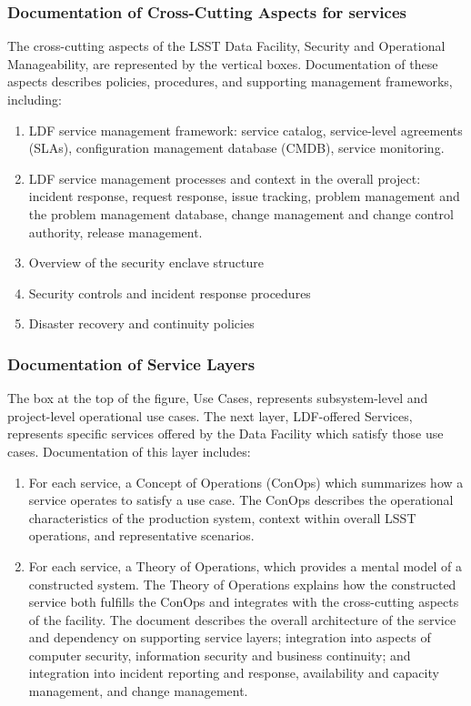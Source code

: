 \subsubsection {Documentation of Cross-Cutting Aspects for services}

The cross-cutting aspects of the LSST Data Facility, Security and Operational Manageability, are represented by the vertical boxes. Documentation of these aspects describes policies, procedures, and supporting management frameworks, including:
\begin{enumerate}
	\item	LDF service management framework: service catalog, service-level agreements (SLAs), configuration management database (CMDB), service monitoring.
	\item	LDF service management processes and context in the overall project: incident response, request response, issue tracking, problem management and the problem management database, change management and change control authority, release management.
	\item	Overview of the security enclave structure
	\item	Security controls and incident response procedures
	\item	Disaster recovery and continuity policies
\end{enumerate}

\subsubsection{Documentation of Service Layers}

The box at the top of the figure, Use Cases, represents subsystem-level and project-level operational use cases. The next layer, LDF-offered Services, represents specific services offered by the Data Facility which satisfy those use cases. Documentation of this layer includes:

\begin{enumerate}
\item	For each service, a Concept of Operations (ConOps) which summarizes how a service operates to satisfy a use case. The ConOps describes the operational characteristics of the production system, context within overall LSST operations, and representative scenarios. 
\item	For each service, a Theory of Operations, which provides a mental model of a constructed system. The Theory of Operations explains how the constructed service both fulfills the ConOps and integrates with the cross-cutting aspects of the facility. The document describes the overall architecture of the service and dependency on supporting service layers; integration into aspects of computer security, information security and business continuity; and integration into incident reporting and response, availability and capacity management, and change management.
\end{enumerate}

